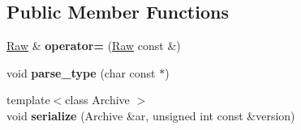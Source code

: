 \subsection*{\-Public \-Member \-Functions}
\begin{DoxyCompactItemize}
\item 
\hypertarget{classglutpp_1_1shape_1_1Raw_a713de17f9c805f1eead3bd6e92bb6be1}{\hyperlink{classglutpp_1_1shape_1_1Raw}{\-Raw} \& {\bfseries operator=} (\hyperlink{classglutpp_1_1shape_1_1Raw}{\-Raw} const \&)}\label{classglutpp_1_1shape_1_1Raw_a713de17f9c805f1eead3bd6e92bb6be1}

\item 
\hypertarget{classglutpp_1_1shape_1_1Raw_a860512ceb55442338e074be51aba369c}{void {\bfseries parse\-\_\-type} (char const $\ast$)}\label{classglutpp_1_1shape_1_1Raw_a860512ceb55442338e074be51aba369c}

\item 
\hypertarget{classglutpp_1_1shape_1_1Raw_a9930099e17b7fdd5fd0eb866867444c0}{{\footnotesize template$<$class Archive $>$ }\\void {\bfseries serialize} (\-Archive \&ar, unsigned int const \&version)}\label{classglutpp_1_1shape_1_1Raw_a9930099e17b7fdd5fd0eb866867444c0}

\end{DoxyCompactItemize}
